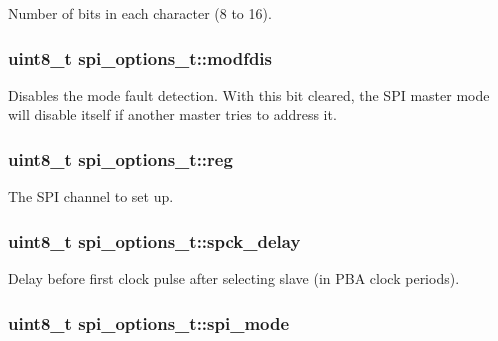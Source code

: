 \-Number of bits in each character (8 to 16). 

\hypertarget{structspi__options__t_a734ad2abb63f00b69a38ef1eb7c68812}{
\subsubsection[{modfdis}]{\setlength{\rightskip}{0pt plus 5cm}uint8\-\_\-t {\bf spi\-\_\-options\-\_\-t\-::modfdis}}}
\label{structspi__options__t_a734ad2abb63f00b69a38ef1eb7c68812}
\-Disables the mode fault detection. \-With this bit cleared, the \-S\-P\-I master mode will disable itself if another master tries to address it. \hypertarget{structspi__options__t_a9f89caeb223b8e82f29628a47eb66f9a}{
\subsubsection[{reg}]{\setlength{\rightskip}{0pt plus 5cm}uint8\-\_\-t {\bf spi\-\_\-options\-\_\-t\-::reg}}}
\label{structspi__options__t_a9f89caeb223b8e82f29628a47eb66f9a}


\-The \-S\-P\-I channel to set up. 

\hypertarget{structspi__options__t_a86f15a4bd903dc7f46001b017d6396c8}{
\subsubsection[{spck\-\_\-delay}]{\setlength{\rightskip}{0pt plus 5cm}uint8\-\_\-t {\bf spi\-\_\-options\-\_\-t\-::spck\-\_\-delay}}}
\label{structspi__options__t_a86f15a4bd903dc7f46001b017d6396c8}


\-Delay before first clock pulse after selecting slave (in \-P\-B\-A clock periods). 

\hypertarget{structspi__options__t_aeb3e5bbe92bd45feadb8fc3abe2ea402}{
\subsubsection[{spi\-\_\-mode}]{\setlength{\rightskip}{0pt plus 5cm}uint8\-\_\-t {\bf spi\-\_\-options\-\_\-t\-::spi\-\_\-mode}}}
\label{structspi__options__t_aeb3e5bbe92bd45feadb8fc3abe2ea402}


